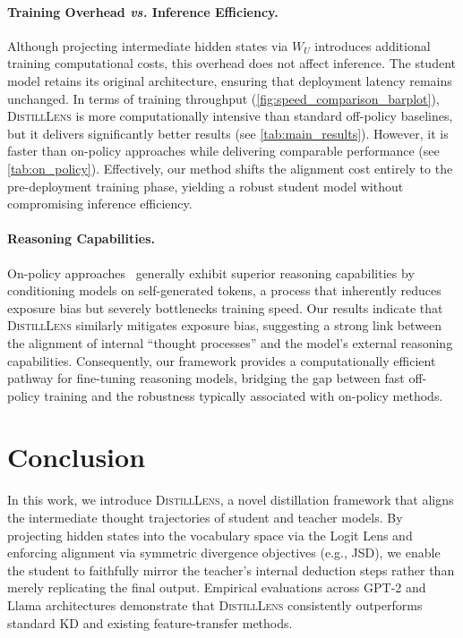 \documentclass{article}
\theoremstyle{plain}
\theoremstyle{definition}
\theoremstyle{remark}
\begin{document}
\paragraph{Training Overhead \textit{vs.} Inference Efficiency.}
Although projecting intermediate hidden states via $W_U$ introduces additional training computational costs, this overhead does not affect inference. 
The student model retains its original architecture, ensuring that deployment latency remains unchanged. 
In terms of training throughput (\cref{fig:speed_comparison_barplot}), \textsc{DistillLens} is more computationally intensive than standard off-policy baselines, but it delivers significantly better results (see \cref{tab:main_results}). 
However, it is faster than on-policy approaches while delivering comparable performance (see \cref{tab:on_policy}). 
Effectively, our method shifts the alignment cost entirely to the pre-deployment training phase, yielding a robust student model without compromising inference efficiency.


\paragraph{Reasoning Capabilities.}
On-policy approaches~\cite{ouyang2022training,shao2024deepseekmath,gu2024minillm} generally exhibit superior reasoning capabilities by conditioning models on self-generated tokens, a process that inherently reduces exposure bias but severely bottlenecks training speed. 
Our results indicate that \textsc{DistillLens} similarly mitigates exposure bias, suggesting a strong link between the alignment of internal ``thought processes'' and the model's external reasoning capabilities. 
Consequently, our framework provides a computationally efficient pathway for fine-tuning reasoning models, bridging the gap between fast off-policy training and the robustness typically associated with on-policy methods.



\section{Conclusion}
\label{sec:conclusion}
In this work, we introduce \textsc{DistillLens}, a novel distillation framework that aligns the intermediate thought trajectories of student and teacher models. By projecting hidden states into the vocabulary space via the Logit Lens and enforcing alignment via symmetric divergence objectives (e.g., JSD), we enable the student to faithfully mirror the teacher's internal deduction steps rather than merely replicating the final output. Empirical evaluations across GPT-2 and Llama architectures demonstrate that \textsc{DistillLens} consistently outperforms standard KD and existing feature-transfer methods.
\end{document}
